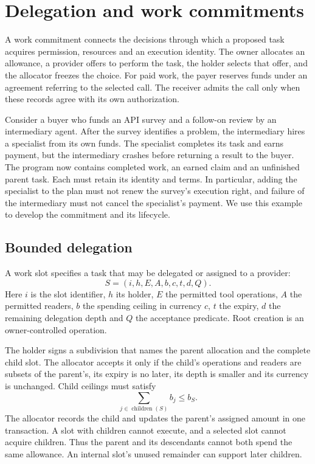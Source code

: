 \section{Delegation and work commitments}
\label{sec:contract}
A work commitment connects the decisions through which a proposed task acquires
permission, resources and an execution identity. The owner allocates an
allowance, a provider offers to perform the task, the holder selects that offer,
and the allocator freezes the choice. For paid work, the payer reserves funds
under an agreement referring to the selected call. The receiver admits the call
only when these records agree with its own authorization.

Consider a buyer who funds an API survey and a follow-on review by an
intermediary agent. After the survey identifies a problem, the intermediary
hires a specialist from its own funds. The specialist completes its task and
earns payment, but the intermediary crashes before returning a result to the
buyer. The program now contains completed work, an earned claim and an
unfinished parent task. Each must retain its identity and terms. In particular,
adding the specialist to the plan must not renew the survey's execution right,
and failure of the intermediary must not cancel the specialist's payment.
We use this example to develop the commitment and its lifecycle.

\subsection{Bounded delegation}
A work slot specifies a task that may be delegated or assigned to a provider:
\[
 S=(i,h,E,A,b,c,t,d,Q).
\]
Here $i$ is the slot identifier, $h$ its holder, $E$ the permitted tool operations,
$A$ the permitted readers, $b$ the spending ceiling in currency $c$, $t$ the
expiry, $d$ the remaining delegation depth and $Q$ the acceptance predicate.
Root creation is an owner-controlled operation.

The holder signs a subdivision that names the parent allocation and the complete
child slot. The allocator accepts it only if the child's operations and readers
are subsets of the parent's, its expiry is no later, its depth is smaller and
its currency is unchanged. Child ceilings must satisfy
\[
 \sum_{j\in\operatorname{children}(S)} b_j\leq b_S.
\]
The allocator records the child and updates the parent's assigned amount in one
transaction. A slot with children cannot execute, and a selected slot cannot
acquire children. Thus the parent and its descendants cannot both spend the
same allowance. An internal slot's unused remainder can support later children.

